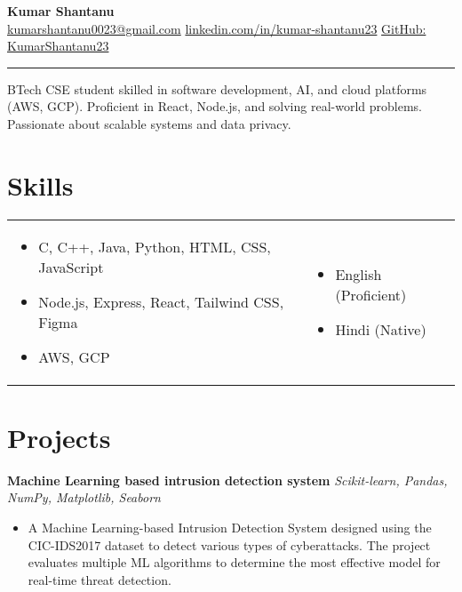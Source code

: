 \documentclass[a4paper,10pt]{article}
\begin{document}
{\LARGE \textbf{Kumar Shantanu}}\\
\href{mailto:kumarshantanu0023@gmail.com}{kumarshantanu0023@gmail.com} \hfill 
\href{https://www.linkedin.com/in/kumar-shantanu23/}{linkedin.com/in/kumar-shantanu23} \hfill 
\href{https://github.com/KumarShantanu23}{GitHub: KumarShantanu23}
\vspace{-1em}

\rule{\textwidth}{0.4pt}

\noindent BTech CSE student skilled in software development, AI, and cloud platforms (AWS, GCP). Proficient in React, Node.js, and solving real-world problems. Passionate about scalable systems and data privacy.

\vspace{-0.2em}
\section*{Skills}
\begin{tabular}{p{} p{}}
\begin{itemize}[leftmargin=1em, itemsep=0.1em]
    \item C, C++, Java, Python, HTML, CSS, JavaScript
    \item Node.js, Express, React, Tailwind CSS, Figma
    \item AWS, GCP
\end{itemize}
&
\begin{itemize}[leftmargin=5em, itemsep=0.1em]
    \item English (Proficient)
    \item Hindi (Native)
\end{itemize}
\end{tabular}



\vspace{-0.5em}
\section*{Projects}
\textbf{Machine Learning based intrusion detection system} \hfill 
\vspace{-1em}
\textit{Scikit-learn, Pandas, NumPy, Matplotlib, Seaborn} \\
\begin{itemize}[leftmargin=1em,label=, itemsep=0.3em]
    \item A Machine Learning-based Intrusion Detection System designed using the CIC-IDS2017 dataset to detect various types of cyberattacks. The project evaluates multiple ML algorithms to determine the most effective model for real-time threat detection.
\end{itemize}
\end{document}
